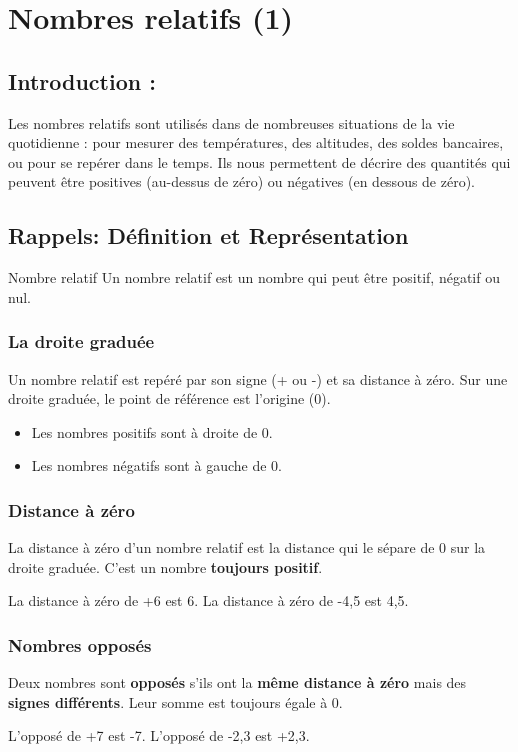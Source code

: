 \chapter{Nombres relatifs (1)}

\section{Introduction :}
Les nombres relatifs sont utilisés dans de nombreuses situations de la vie quotidienne : pour mesurer des températures, des altitudes, des soldes bancaires, ou pour se repérer dans le temps. Ils nous permettent de décrire des quantités qui peuvent être positives (au-dessus de zéro) ou négatives (en dessous de zéro).

\section{Rappels: Définition et Représentation}
\begin{definition}{Nombre relatif}
Un nombre relatif est un nombre qui peut être positif, négatif ou nul.
\end{definition}

\subsection{La droite graduée}
Un nombre relatif est repéré par son signe (+ ou -) et sa distance à zéro.\newline
Sur une droite graduée, le point de référence est l'origine (0).
\begin{itemize}[label=\textbullet]
\item Les nombres positifs sont à droite de 0.
\item Les nombres négatifs sont à gauche de 0.
\end{itemize}

\subsection{Distance à zéro}
La distance à zéro d'un nombre relatif est la distance qui le sépare de 0 sur la droite graduée. C'est un nombre \textbf{toujours positif}.
\begin{exemple}
La distance à zéro de +6 est 6. La distance à zéro de -4,5 est 4,5.
\end{exemple}

\subsection{Nombres opposés}
Deux nombres sont \textbf{opposés} s'ils ont la \textbf{même distance à zéro} mais des \textbf{signes différents}. Leur somme est toujours égale à 0.
\begin{exemple}
L'opposé de +7 est -7. L'opposé de -2,3 est +2,3.
\end{exemple}

